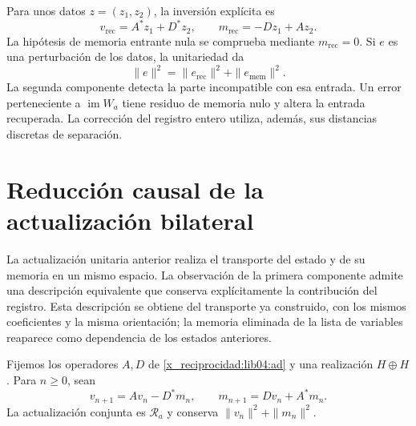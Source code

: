 Para unos datos \(z=(z_1,z_2)\), la inversión explícita es
\begin{equation}
 v_{\mathrm{rec}}=A^*z_1+D^*z_2,\qquad
 m_{\mathrm{rec}}=-Dz_1+Az_2.
 \label{x_reciprocidad:lib04:inversa-unitaria}
\end{equation}
La hipótesis de memoria entrante nula se comprueba mediante
\(m_{\mathrm{rec}}=0\). Si \(e\) es una perturbación de los datos,
la unitariedad da
\begin{equation}
 \|e\|^2=\|e_{\mathrm{rec}}\|^2+\|e_{\mathrm{mem}}\|^2.
 \label{x_reciprocidad:lib04:descomposicion-ruido}
\end{equation}
La segunda componente detecta la parte incompatible con esa entrada.
Un error perteneciente a \(\operatorname{im}W_a\) tiene residuo de
memoria nulo y altera la entrada recuperada. La corrección del registro
entero utiliza, además, sus distancias discretas de separación.


\section{Reducción causal de la actualización bilateral}
\label{x_reciprocidad:lib04:reduccion-causal}

La actualización unitaria anterior realiza el transporte del estado y de su
memoria en un mismo espacio. La observación de la primera componente admite
una descripción equivalente que conserva explícitamente la contribución del
registro. Esta descripción se obtiene del transporte ya construido, con los
mismos coeficientes y la misma orientación; la memoria eliminada de la lista
de variables reaparece como dependencia de los estados anteriores.

Fijemos los operadores \(A,D\) de \eqref{x_reciprocidad:lib04:ad} y una realización
\(H\oplus H\). Para \(n\geq0\), sean
\begin{equation}
 v_{n+1}=Av_n-D^*m_n,\qquad
 m_{n+1}=Dv_n+A^*m_n.
 \label{x_reciprocidad:lib04:recurrencia-memoria}
\end{equation}
La actualización conjunta es \(\mathscr R_a\) y conserva
\(\|v_n\|^2+\|m_n\|^2\).

